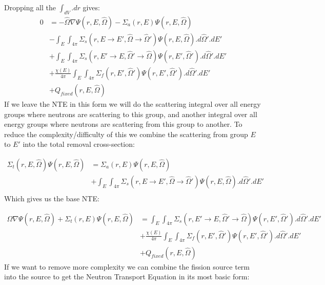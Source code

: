 \documentclass[11pt,letterpaper,titlepage]{article}
\numberwithin{equation}{section}
\begin{document}
\noindent Dropping all the $\int_{dV}.dr$ gives:
\begin{equation}
\begin{aligned}
 0
&= -\hat{\Omega} \nabla \Psi (r,E,\hat{\Omega})
- \Sigma_a (r,E)\Psi(r,E,\hat{\Omega})\\
&-  \int_E \int_{4\pi} 
\Sigma_s (r,E{\to} E',\hat{\Omega} {\to} \hat{\Omega}') \Psi (r,E,\hat{\Omega}) 
.d\hat{\Omega}'.dE'\\
&+  \int_E \int_{4\pi}
\Sigma_s (r,E'{\to} E,\hat{\Omega}' {\to} \hat{\Omega}) \Psi (r,E',\hat{\Omega}') 
.d\hat{\Omega}'.dE'\\
&+\frac{\chi (E)}{4\pi} 
  \int_E \int_{4\pi} 
\Sigma_f (r,E',\hat{\Omega}') \Psi (r,E',\hat{\Omega}') 
.d\hat{\Omega}'.dE'\\
&+ Q_{fixed}(r,E,\hat{\Omega})
\end{aligned}
\end{equation}
\newline
If we leave the NTE in this form we will do the scattering integral over all energy groups where neutrons are scattering to this group, and another integral over all energy groups where neutrons are scattering from this group to another. To reduce the complexity/difficulty of this we combine the scattering from group $E$ to $E'$ into the total removal cross-section:

\begin{equation*}
\begin{aligned}
\Sigma_t (r,E,\hat{\Omega})\Psi(r,E,\hat{\Omega}) &=  \Sigma_a (r,E)\Psi(r,E,\hat{\Omega})\\
&+  \int_E \int_{4\pi} 
\Sigma_s (r,E{\to} E',\hat{\Omega} {\to} \hat{\Omega}') \Psi (r,E,\hat{\Omega}) 
.d\hat{\Omega}'.dE'\\
\end{aligned}
\end{equation*}
\newline
Which gives us the base NTE:

\begin{equation}
\begin{aligned}
\hat{\Omega}\nabla \Psi (r,E,\hat{\Omega}) 
+\Sigma_t (r,E)\Psi(r,E,\hat{\Omega})
&=  \int_E \int_{4\pi}
\Sigma_s (r,E'{\to} E,\hat{\Omega}' {\to} \hat{\Omega}) \Psi (r,E',\hat{\Omega}') 
.d\hat{\Omega}'.dE'\\
&+\frac{\chi (E)}{4\pi} 
  \int_E \int_{4\pi} 
\Sigma_f (r,E',\hat{\Omega}') \Psi (r,E',\hat{\Omega}') 
.d\hat{\Omega}'.dE'\\
&+ Q_{fixed}(r,E,\hat{\Omega})
\end{aligned}
\end{equation}
\newline
\newline
If we want to remove more complexity we can combine the fission source term into the source to get the Neutron Transport Equation in its most basic form:
\end{document}
